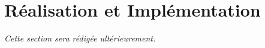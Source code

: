 \chapter{Réalisation et Implémentation}
\label{chap:realisation}
\textit{Cette section sera rédigée ultérieurement.}
